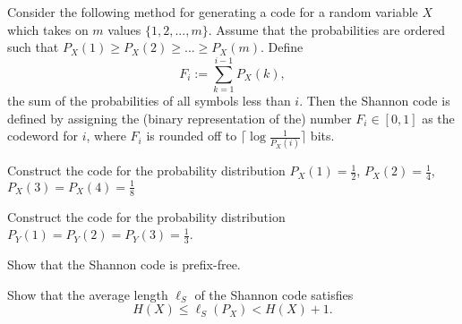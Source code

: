 \documentclass[a4paper,10pt,landscape,twocolumn]{scrartcl}
\begin{document}
\begin{exercise}
Consider the following method for generating a code for a random variable $X$ which takes on $m$ values $\{1,2,...,m\}$. Assume that the probabilities are ordered such that $P_X(1) \geq P_X(2) \geq ... \geq P_X(m)$. Define
\[
F_i := \sum_{k=1}^{i-1} P_X(k),
\]
the sum of the probabilities of all symbols less than $i$. Then the Shannon code is defined by assigning the (binary representation of the) number $F_i \in [0,1]$ as the codeword for $i$, where $F_i$ is rounded off to $\lceil \log\frac{1}{P_X(i)}\rceil$ bits.
	\begin{subex}[(1pt)]
	Construct the code for the probability distribution $P_X(1) = \frac{1}{2}$, $P_X(2) = \frac{1}{4}$, $P_X(3) = P_X(4) = \frac{1}{8}$
	\end{subex}
	\begin{subex}[(1pt)]
	Construct the code for the probability distribution $P_Y(1) = P_Y(2) = P_Y(3) = \frac{1}{3}$.
	\end{subex}
	\begin{subex}[(2pt)]
	Show that the Shannon code is prefix-free.
	\end{subex}
	\begin{subex}[(2pt)]
	Show that the average length $\ell_S$ of the Shannon code satisfies
	\[
	H(X) \leq \ell_S(P_X) < H(X) + 1.
	\]
	\end{subex}
\end{exercise}



\newcommand{\typsetA}{A^{(n)}_{\varepsilon}}
\newcommand{\typsetB}{B^{(n)}_{\delta}}
\end{document}
